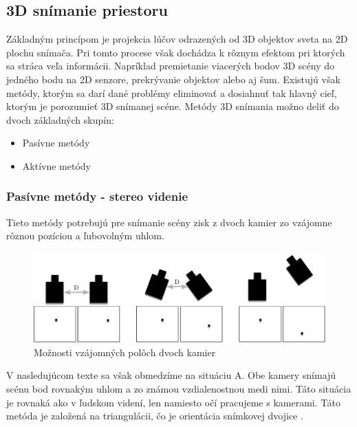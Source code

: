 \subsection{3D snímanie priestoru}
Základným princípom je projekcia lúčov odrazených od 3D objektov sveta na 2D plochu snímača.  \cite{Analysis_and_Machine_Vision} Pri tomto procese však dochádza k rôznym efektom pri ktorých sa stráca veľa informácii. Napríklad premietanie viacerých bodov 3D scény do jedného bodu na 2D senzore, prekrývanie objektov alebo aj šum. Existujú však metódy, ktorým sa darí dané problémy eliminovať a dosiahnuť tak  hlavný cieľ, ktorým je porozumieť 3D snímanej scéne. Metódy 3D snímania možno deliť do dvoch základných skupín: 

\begin{itemize}
\item Pasívne metódy
\item Aktívne metódy 
\end{itemize}

\subsubsection{Pasívne metódy - stereo videnie}
Tieto metódy potrebujú pre snímanie scény zisk z dvoch kamier zo vzájomne rôznou pozíciou a ľubovolným uhlom. 

\begin{figure}[H]
\begin{center}
	\includegraphics[scale=0.5]{images/3D_cameraPos}
	\caption{Možnosti vzájomných polôch dvoch kamier}
	\end{center}
\end{figure}


V nasledujúcom texte sa však obmedzíme na situáciu A. Obe kamery snímajú scénu bod rovnakým uhlom a zo známou vzdialenostnou medi nimi. Táto situácia je rovnaká ako v ľudskom videní, len namiesto očí pracujeme s kamerami. Táto metóda je založená na triangulácii, čo je orientácia snímkovej dvojice \cite{Algorithms_and_Applications}. 

